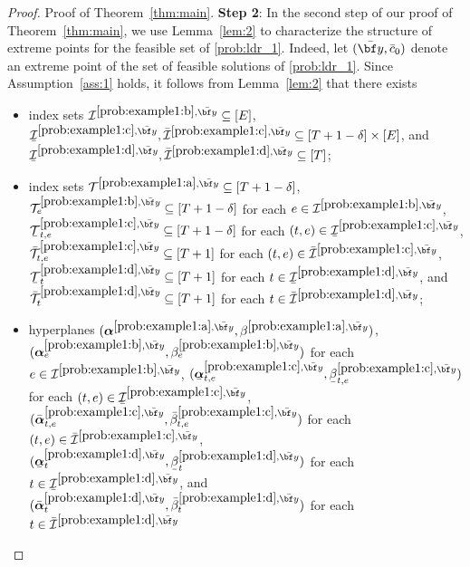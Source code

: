 \documentclass[nonblindrev,mnsc]{informs3} %
\newcommand{\by}{{\bf y}}
\newcommand{\balpha}{{\boldsymbol{\alpha}}}
\newcommand{\ubar}[1]{\text{\b{$#1$}}}
\begin{document}
\begin{APPENDICES}
\begin{proof}{Proof of Theorem~\ref{thm:main}. }
\vspace{0.5em}
\textbf{Step 2}:   In the second step of our proof of Theorem~\ref{thm:main}, we use Lemma~\ref{lem:2} to characterize the structure of extreme points for the feasible set of \eqref{prob:ldr_1}. Indeed, let $(\bar{\by},\bar{c}_0)$ denote an extreme point of the set of feasible solutions of \eqref{prob:ldr_1}. Since Assumption~\ref{ass:1} holds, 
   it follows from Lemma~\ref{lem:2} that there exists 
\begin{itemize}
\item
index sets $\mathcal{I}^{\ref{prob:example1:b},\bar{\by}} \subseteq [E]$,   $\ubar{\mathcal{I}}^{\ref{prob:example1:c},\bar{\by}},\bar{\mathcal{I}}^{\ref{prob:example1:c},\bar{\by}} \subseteq [T+1-\delta]\times[E]$, and  $\ubar{\mathcal{I}}^{\ref{prob:example1:d},\bar{\by}},\bar{\mathcal{I}}^{\ref{prob:example1:d},\bar{\by}}  \subseteq [T]$; 
\item index sets $\mathcal{T}^{\ref{prob:example1:a},\bar{\by}} \subseteq [T+1-\delta]$, $\mathcal{T}^{\ref{prob:example1:b},\bar{\by}}_e \subseteq [T+1-\delta]$ for each $e \in \mathcal{I}^{\ref{prob:example1:b},\bar{\by}}$,  $\ubar{\mathcal{T}}^{\ref{prob:example1:c},\bar{\by}}_{t,e} \subseteq [T+1-\delta]$ for each $(t,e) \in \ubar{\mathcal{I}}^{\ref{prob:example1:c},\bar{\by}}$, 
$\bar{\mathcal{T}}^{\ref{prob:example1:c},\bar{\by}}_{t,e} \subseteq [T+1]$  for each $(t,e) \in \bar{\mathcal{I}}^{\ref{prob:example1:c},\bar{\by}}$, 
$\ubar{\mathcal{T}}^{\ref{prob:example1:d},\bar{\by}}_{t} \subseteq [T+1]$ for each $t \in \ubar{\mathcal{I}}^{\ref{prob:example1:d},\bar{\by}}$,  and  $\bar{\mathcal{T}}^{\ref{prob:example1:d},\bar{\by}}_{t} \subseteq [T+1]$ for each $t \in \bar{\mathcal{I}}^{\ref{prob:example1:d},\bar{\by}}$;
\item  hyperplanes $(\balpha^{\ref{prob:example1:a},\bar{\by}},\beta^{\ref{prob:example1:a},\bar{\by}})$, $(\balpha^{\ref{prob:example1:b},\bar{\by}}_e,\beta^{\ref{prob:example1:b},\bar{\by}}_e)$ for each $e \in {\mathcal{I}}^{\ref{prob:example1:b},\bar{\by}}$, $(\ubar{\balpha}^{\ref{prob:example1:c},\bar{\by}}_{t,e},\ubar{\beta}^{\ref{prob:example1:c},\bar{\by}}_{t,e})$ for each $(t,e) \in \ubar{\mathcal{I}}^{\ref{prob:example1:c},\bar{\by}}$, 
  $(\bar{\balpha}^{\ref{prob:example1:c},\bar{\by}}_{t,e},\bar{\beta}^{\ref{prob:example1:c},\bar{\by}}_{t,e})$ for each $(t,e) \in \bar{\mathcal{I}}^{\ref{prob:example1:c},\bar{\by}}$,  $(\ubar{\balpha}^{\ref{prob:example1:d},\bar{\by}}_{t},\ubar{\beta}^{\ref{prob:example1:d},\bar{\by}}_{t})$ for each $t \in \ubar{\mathcal{I}}^{\ref{prob:example1:d}, \bar{\by}}$, and  $(\bar{\balpha}^{\ref{prob:example1:d},\bar{\by}}_{t},\bar{\beta}^{\ref{prob:example1:d},\bar{\by}}_{t})$ for each $t \in \bar{\mathcal{I}}^{\ref{prob:example1:d}, \bar{\by}}$ 

\end{itemize}
\end{proof}
\end{APPENDICES}
\end{document}
